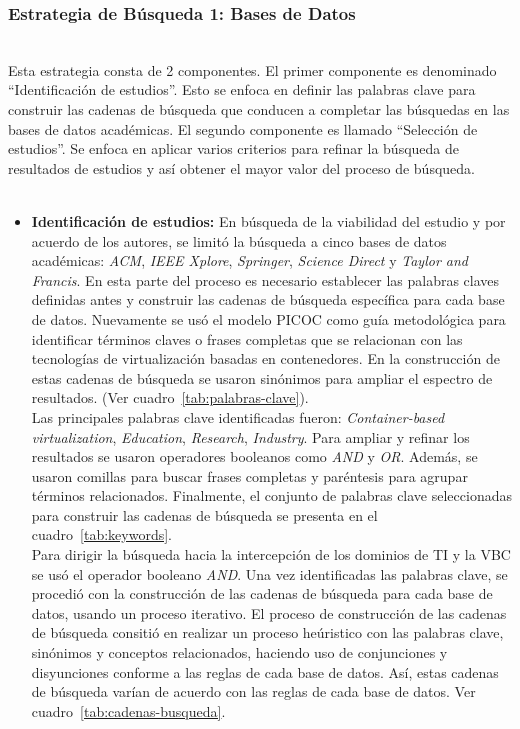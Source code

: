 \subsubsection{Estrategia de Búsqueda 1: Bases de Datos}
\mbox{}\\
Esta estrategia consta de 2 componentes. El primer componente es denominado ``Identificación de estudios''. Esto se enfoca en definir las palabras clave para construir las cadenas de búsqueda que conducen a completar las búsquedas en las bases de datos académicas.
El segundo componente es llamado ``Selección de estudios''. Se enfoca en aplicar varios criterios para refinar la búsqueda de resultados de estudios y así obtener el mayor valor del proceso de búsqueda. \\ \\

\begin{itemize}
    \item \textbf{Identificación de estudios: } En búsqueda de la viabilidad del estudio y por acuerdo de los autores, se limitó la búsqueda a cinco bases de datos académicas: \textit{ACM}, \textit{IEEE Xplore}, \textit{Springer}, \textit{Science Direct} y \textit{Taylor and Francis}. En esta parte del proceso es necesario establecer las palabras claves definidas antes y construir las cadenas de búsqueda específica para cada base de datos. Nuevamente se usó el modelo PICOC como guía metodológica para identificar términos claves o frases completas que se relacionan con las tecnologías de virtualización basadas en contenedores. En la construcción de estas cadenas de búsqueda se usaron sinónimos para ampliar el espectro de resultados. (Ver cuadro~\ref{tab:palabras-clave}).\\ 
    Las principales palabras clave identificadas fueron: \textit{Container-based virtualization}, \textit{Education}, \textit{Research}, \textit{Industry}. Para ampliar y refinar los resultados se usaron operadores booleanos como \textit{AND} y \textit{OR}. Además, se usaron comillas para buscar frases completas y paréntesis para agrupar términos relacionados. Finalmente, el conjunto de palabras clave seleccionadas para construir las cadenas de búsqueda se presenta en el cuadro~\ref{tab:keywords}.\\
    Para dirigir la búsqueda hacia la intercepción de los dominios de TI y la VBC se usó el operador booleano \textit{AND}. Una vez identificadas las palabras clave, se procedió con la construcción de las cadenas de búsqueda para cada base de datos, usando un proceso iterativo. El proceso de construcción de las cadenas de búsqueda consitió en realizar un proceso heúristico con las palabras clave, sinónimos y conceptos relacionados, haciendo uso de conjunciones y disyunciones conforme a las reglas de cada base de datos. Así, estas cadenas de búsqueda varían de acuerdo con las reglas de cada base de datos. Ver cuadro~\ref{tab:cadenas-busqueda}.\\


\end{itemize}
